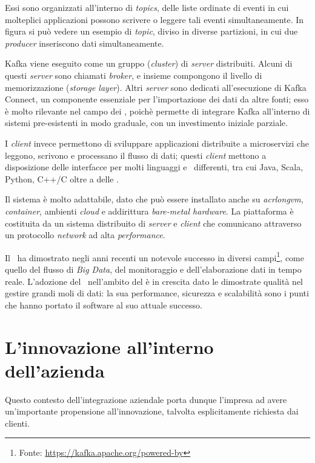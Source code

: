 Essi sono organizzati all'interno di \textit{topics}, delle liste ordinate di eventi in cui molteplici applicazioni possono scrivere o leggere tali eventi simultaneamente.
In figura si può vedere un esempio di \textit{topic}, diviso in diverse partizioni, in cui due \textit{producer} inseriscono dati simultaneamente.

Kafka viene eseguito come un gruppo (\textit{cluster}) di \textit{server} distribuiti.
Alcuni di questi \textit{server} sono chiamati \textit{broker}, e insieme compongono il livello di memorizzazione (\textit{storage layer}).
Altri \textit{server} sono dedicati all'esecuzione di Kafka Connect, un componente essenziale per l'importazione dei dati da altre fonti; esso è molto rilevante nel campo dei \middleware, poichè permette di integrare Kafka all'interno di sistemi pre-esistenti in modo graduale, con un investimento iniziale parziale.

I \textit{client} invece permettono di sviluppare applicazioni distribuite a microservizi che leggono, scrivono e processano il flusso di dati; questi \textit{client} mettono a disposizione delle interfacce per molti linguaggi e \software\ differenti, tra cui Java, Scala, Python, C++/C oltre a delle  .

Il sistema è molto adattabile, dato che può essere installato anche su \textit{acrlong{vm}}, \textit{container}, ambienti \textit{cloud} e addirittura \textit{bare-metal hardware}.
La piattaforma è costituita da un sistema distribuito di \textit{server} e \textit{client} che comunicano attraverso un protocollo \textit{network}  ad alta \textit{performance}.

Il \software\ ha dimostrato negli anni recenti un notevole successo in diversi campi\footnote{Fonte: \url{https://kafka.apache.org/powered-by}}, come quello del flusso di \textit{Big Data}, del monitoraggio e dell'elaborazione dati in tempo reale.
L'adozione del \software\ nell'ambito del  è in crescita dato le dimostrate qualità nel gestire grandi moli di dati: la sua performance, sicurezza e scalabilità sono i punti che hanno portato il software al suo attuale successo.

\section{L'innovazione all'interno dell'azienda}


Questo contesto dell'integrazione aziendale porta dunque l'impresa ad avere un'importante propensione all'innovazione, talvolta esplicitamente richiesta dai clienti.

